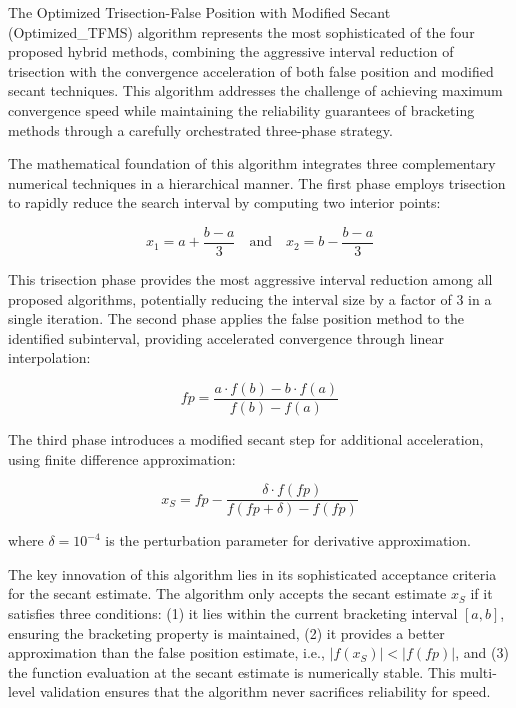 \documentclass[amsmath, amssymb, aps]{revtex4-2}
\begin{document}
The Optimized Trisection-False Position with Modified Secant (Optimized\_TFMS) algorithm represents the most sophisticated of the four proposed hybrid methods, combining the aggressive interval reduction of trisection with the convergence acceleration of both false position and modified secant techniques. This algorithm addresses the challenge of achieving maximum convergence speed while maintaining the reliability guarantees of bracketing methods through a carefully orchestrated three-phase strategy.

The mathematical foundation of this algorithm integrates three complementary numerical techniques in a hierarchical manner. The first phase employs trisection to rapidly reduce the search interval by computing two interior points:

\begin{equation}
x_1 = a + \frac{b - a}{3} \quad \text{and} \quad x_2 = b - \frac{b - a}{3}
\end{equation}

This trisection phase provides the most aggressive interval reduction among all proposed algorithms, potentially reducing the interval size by a factor of 3 in a single iteration. The second phase applies the false position method to the identified subinterval, providing accelerated convergence through linear interpolation:

\begin{equation}
fp = \frac{a \cdot f(b) - b \cdot f(a)}{f(b) - f(a)}
\end{equation}

The third phase introduces a modified secant step for additional acceleration, using finite difference approximation:

\begin{equation}
x_S = fp - \frac{\delta \cdot f(fp)}{f(fp + \delta) - f(fp)}
\end{equation}

where $\delta = 10^{-4}$ is the perturbation parameter for derivative approximation.

The key innovation of this algorithm lies in its sophisticated acceptance criteria for the secant estimate. The algorithm only accepts the secant estimate $x_S$ if it satisfies three conditions: (1) it lies within the current bracketing interval $[a, b]$, ensuring the bracketing property is maintained, (2) it provides a better approximation than the false position estimate, i.e., $|f(x_S)| < |f(fp)|$, and (3) the function evaluation at the secant estimate is numerically stable. This multi-level validation ensures that the algorithm never sacrifices reliability for speed.
\end{document}
